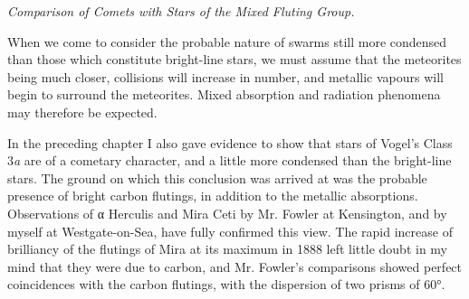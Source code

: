 \documentclass[a4paper, 12pt, oneside, polutonikogreek, english]{article}
\begin{document}
\emph{Comparison of Comets with Stars of the Mixed Fluting Group.}

When we come to consider the probable nature of swarms still more condensed than those which constitute bright-line stars, we must assume that the meteorites being much closer, collisions will increase in number, and metallic vapours will begin to surround the meteorites. Mixed absorption and radiation phenomena may therefore be expected.

In the preceding chapter I also gave evidence to show that stars of Vogel's Class 3\emph{a} are of a cometary character, and a little more condensed than the bright-line stars. The ground on which this conclusion was arrived at was the probable presence of bright carbon flutings, in addition to the metallic absorptions. Observations of α Herculis and Mira Ceti by Mr. Fowler at Kensington, and by myself at Westgate-on-Sea, have fully confirmed this view. The rapid increase of brilliancy of the flutings of Mira at its maximum in 1888 left little doubt in my mind that they were due to carbon, and Mr. Fowler's comparisons showed perfect coincidences with the carbon flutings, with the dispersion of two prisms of 60°.
\end{document}
